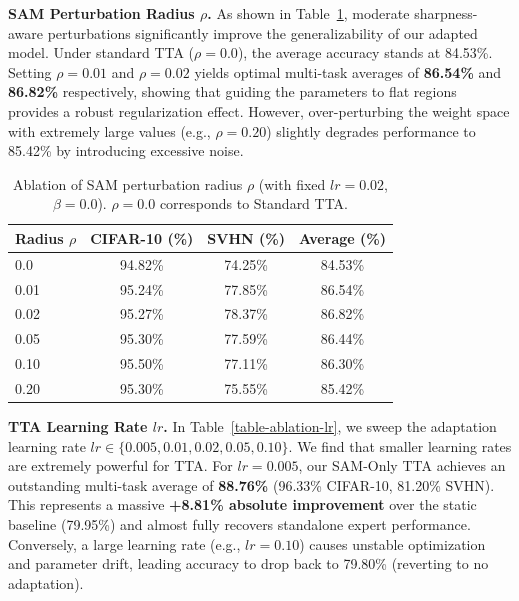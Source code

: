 \documentclass{article}
\theoremstyle{plain}
\theoremstyle{definition}
\theoremstyle{remark}
\begin{document}
\textbf{SAM Perturbation Radius $\rho$.} As shown in Table~\ref{table-ablation-rho}, moderate sharpness-aware perturbations significantly improve the generalizability of our adapted model. Under standard TTA ($\rho=0.0$), the average accuracy stands at 84.53\%. Setting $\rho=0.01$ and $\rho=0.02$ yields optimal multi-task averages of \textbf{86.54\%} and \textbf{86.82\%} respectively, showing that guiding the parameters to flat regions provides a robust regularization effect. However, over-perturbing the weight space with extremely large values (e.g., $\rho=0.20$) slightly degrades performance to 85.42\% by introducing excessive noise.

\begin{table}[h]
  \caption{Ablation of SAM perturbation radius $\rho$ (with fixed $lr = 0.02$, $\beta = 0.0$). $\rho = 0.0$ corresponds to Standard TTA.}
  \label{table-ablation-rho}
  \vskip 0.15in
  \begin{center}
    \begin{small}
      \setlength{\tabcolsep}{5pt}
      \begin{tabular}{lccc}
        \toprule
        Radius $\rho$ & CIFAR-10 (\%) & SVHN (\%) & Average (\%) \\
        \midrule
        0.0               & 94.82\% & 74.25\% & 84.53\% \\
        0.01              & 95.24\% & 77.85\% & 86.54\% \\
        0.02              & 95.27\% & 78.37\% & 86.82\% \\
        0.05              & 95.30\% & 77.59\% & 86.44\% \\
        0.10              & 95.50\% & 77.11\% & 86.30\% \\
        0.20              & 95.30\% & 75.55\% & 85.42\% \\
        \bottomrule
      \end{tabular}
    \end{small}
  \end{center}
  \vskip -0.1in
\end{table}

\textbf{TTA Learning Rate $lr$.} In Table~\ref{table-ablation-lr}, we sweep the adaptation learning rate $lr \in \{0.005, 0.01, 0.02, 0.05, 0.10\}$. We find that smaller learning rates are extremely powerful for TTA. For $lr=0.005$, our SAM-Only TTA achieves an outstanding multi-task average of \textbf{88.76\%} (96.33\% CIFAR-10, 81.20\% SVHN). This represents a massive \textbf{+8.81\% absolute improvement} over the static baseline (79.95\%) and almost fully recovers standalone expert performance. Conversely, a large learning rate (e.g., $lr=0.10$) causes unstable optimization and parameter drift, leading accuracy to drop back to 79.80\% (reverting to no adaptation).
\end{document}
